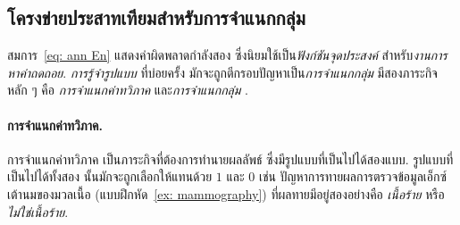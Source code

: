 \subsection{โครงข่ายประสาทเทียมสำหรับการจำแนกกลุ่ม}
\label{sec: ann classification}

สมการ~\ref{eq: ann En} แสดงค่าผิดพลาดกำลังสอง
ซึ่งนิยมใช้เป็น\textit{ฟังก์ชันจุดประสงค์} สำหรับ\textit{งานการหาค่าถดถอย}.
\textit{การรู้จำรูปแบบ}
ที่บ่อยครั้ง มักจะถูกตีกรอบปัญหาเป็น\textit{การจำแนกกลุ่ม} 
มีสองภาระกิจหลัก ๆ คือ
\textit{การจำแนกค่าทวิภาค}
และ\textit{การจำแนกกลุ่ม}
.

\paragraph{การจำแนกค่าทวิภาค.}
การจำแนกค่าทวิภาค
เป็นภาระกิจที่ต้องการทำนายผลลัพธ์
ซึ่งมีรูปแบบที่เป็นไปได้สองแบบ.
รูปแบบที่เป็นไปได้ทั้งสอง นั้นมักจะถูกเลือกให้แทนด้วย $1$ และ $0$
เช่น ปัญหาการทายผลการตรวจข้อมูลเอ็กซ์เต้านมของมวลเนื้อ
(แบบฝึกหัด~\ref{ex: mammography})
ที่ผลทายมีอยู่สองอย่างคือ \textit{เนื้อร้าย} หรือ \textit{ไม่ใช่เนื้อร้าย}.





